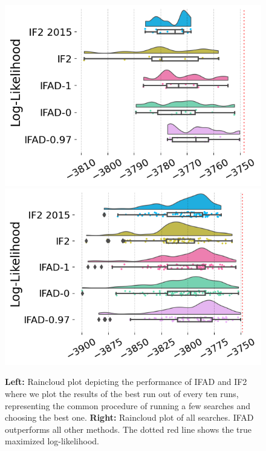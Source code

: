 \documentclass[numsec,webpdf,modern,medium,namedate]{oup-authoring-template}
\newcommand\arxiv[2]{#2} %
\theoremstyle{thmstyleone}%
\theoremstyle{thmstyletwo}%
\theoremstyle{thmstylethree}%
\begin{document}
\begin{figure}[ht]
    \centering
    \includegraphics[width=\arxiv{8cm}{\textwidth/\real{2.2}}]{imgs/095/boxplot.png}
    \includegraphics[width=\arxiv{8cm}{\textwidth/\real{2.2}}]{imgs/095/boxplot_all.png}
    \caption{\textbf{Left:} Raincloud plot depicting the performance of IFAD and IF2 where we plot the results of the best run out of every ten runs, representing the common procedure of running a few searches and choosing the best one. \textbf{Right:} Raincloud plot of all searches. IFAD outperforms all other methods.
    The dotted red line shows the true maximized log-likelihood.}
    \label{fig:boxplot}
    \arxiv{}{\vspace*{-5mm}}
\end{figure}
\end{document}
